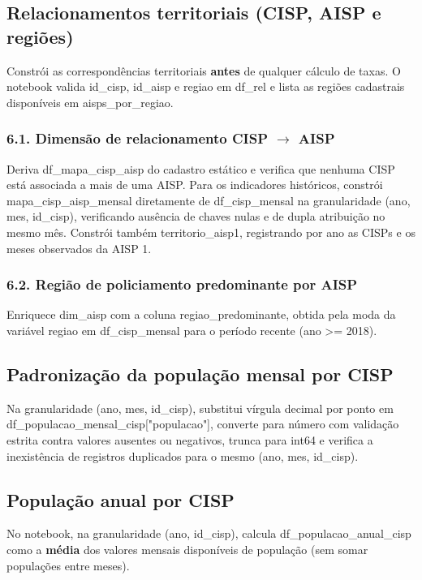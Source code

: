 \documentclass[11pt,a4paper]{article}
\newcommand{\code}[1]{{\ttfamily\footnotesize\allowbreak #1}}
\begin{document}
\subsection{Relacionamentos territoriais (CISP, AISP e regiões)}
Constrói as correspondências territoriais \textbf{antes} de qualquer cálculo de taxas. O notebook valida \code{id\_cisp}, \code{id\_aisp} e \code{regiao} em \code{df\_rel} e lista as regiões cadastrais disponíveis em \code{aisps\_por\_regiao}.

\subsubsection*{6.1. Dimensão de relacionamento CISP $\rightarrow$ AISP}
Deriva \code{df\_mapa\_cisp\_aisp} do cadastro estático e verifica que nenhuma CISP está associada a mais de uma AISP. Para os indicadores históricos, constrói \code{mapa\_cisp\_aisp\_mensal} diretamente de \code{df\_cisp\_mensal} na granularidade \code{(ano, mes, id\_cisp)}, verificando ausência de chaves nulas e de dupla atribuição no mesmo mês. Constrói também \code{territorio\_aisp1}, registrando por ano as CISPs e os meses observados da AISP 1.

\subsubsection*{6.2. Região de policiamento predominante por AISP}
Enriquece \code{dim\_aisp} com a coluna \code{regiao\_predominante}, obtida pela moda da variável \code{regiao} em \code{df\_cisp\_mensal} para o período recente (\code{ano >= 2018}).

\subsection{Padronização da população mensal por CISP}
Na granularidade \code{(ano, mes, id\_cisp)}, substitui vírgula decimal por ponto em \code{df\_populacao\_mensal\_cisp["populacao"]}, converte para número com validação estrita contra valores ausentes ou negativos, trunca para \code{int64} e verifica a inexistência de registros duplicados para o mesmo \code{(ano, mes, id\_cisp)}.

\subsection{População anual por CISP}
No notebook, na granularidade \code{(ano, id\_cisp)}, calcula \code{df\_populacao\_anual\_cisp} como a \textbf{média} dos valores mensais disponíveis de população (sem somar populações entre meses).
\end{document}
